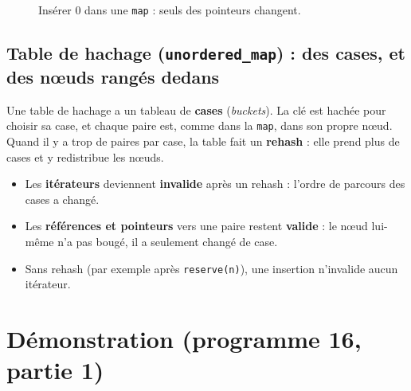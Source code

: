 \documentclass[11pt,a4paper]{article}
\newcommand{\oui}{\textcolor{vert}{\textbf{valide}}}
\newcommand{\non}{\textcolor{rouge}{\textbf{invalide}}}
\begin{document}
\begin{figure}[H]
\centering
{}
\caption{Insérer 0 dans une \texttt{map} : seuls des pointeurs changent.}
\end{figure}

\subsection{Table de hachage (\texttt{unordered\_map}) : des cases, et des nœuds rangés dedans}

Une table de hachage a un tableau de \textbf{cases} (\textit{buckets}). La clé est hachée
pour choisir sa case, et chaque paire est, comme dans la \texttt{map}, dans son propre
nœud. Quand il y a trop de paires par case, la table fait un \textbf{rehash} : elle prend
plus de cases et y redistribue les nœuds.

\begin{itemize}
  \item Les \textbf{itérateurs} deviennent \non{} après un rehash : l'ordre de parcours des
        cases a changé.
  \item Les \textbf{références et pointeurs} vers une paire restent \oui{} : le nœud
        lui-même n'a pas bougé, il a seulement changé de case.
  \item Sans rehash (par exemple après \texttt{reserve(n)}), une insertion n'invalide aucun
        itérateur.
\end{itemize}

\section{Démonstration (programme 16, partie 1)}
\end{document}
